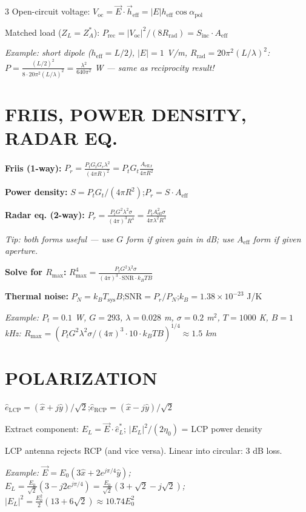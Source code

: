 \documentclass[6pt,landscape]{article}
\begin{document}
\begin{multicols}{3}
Open-circuit voltage: $V_\text{oc}=\vec{E}\cdot\vec{h}_\text{eff}=|E|h_\text{eff}\cos\alpha_\text{pol}$

Matched load ($Z_L=Z_A^*$): $P_\text{rec}=|V_\text{oc}|^2/(8R_\text{rad})=S_\text{inc}\cdot A_\text{eff}$

\textit{Example: short dipole ($h_\text{eff}=L/2$), $|E|=1$ V/m, $R_\text{rad}=20\pi^2(L/\lambda)^2$:
$P=\frac{(L/2)^2}{8\cdot20\pi^2(L/\lambda)^2}=\frac{\lambda^2}{640\pi^2}$ W — same as reciprocity result!}

\section*{FRIIS, POWER DENSITY, RADAR EQ.}
\textbf{Friis (1-way):} $P_r=\frac{P_t G_t G_r\lambda^2}{(4\pi R)^2}=P_t G_t\frac{A_\text{eff,r}}{4\pi R^2}$

\textbf{Power density:} $S=P_t G_t/(4\pi R^2)$;\quad $P_r=S\cdot A_\text{eff}$

\textbf{Radar eq. (2-way):} $P_r=\frac{P_t G^2\lambda^2\sigma}{(4\pi)^3 R^4}=\frac{P_t A_\text{eff}^2\sigma}{4\pi\lambda^2 R^4}$

\textit{Tip: both forms useful — use $G$ form if given gain in dB; use $A_\text{eff}$ form if given aperture.}

\textbf{Solve for $R_\text{max}$:} $R_\text{max}^4=\frac{P_t G^2\lambda^2\sigma}{(4\pi)^3\cdot\text{SNR}\cdot k_B T B}$

\textbf{Thermal noise:} $P_N=k_B T_\text{sys}B$;\quad SNR$=P_r/P_N$;\quad $k_B=1.38\times10^{-23}$ J/K

\textit{Example: $P_t=0.1$ W, $G=293$, $\lambda=0.028$ m, $\sigma=0.2$ m$^2$, $T=1000$ K, $B=1$ kHz:
$R_\text{max}=(P_t G^2\lambda^2\sigma/(4\pi)^3\cdot10\cdot k_B T B)^{1/4}\approx1.5$ km}

\section*{POLARIZATION}
$\hat{e}_\text{LCP}=(\hat{x}+j\hat{y})/\sqrt{2}$;\quad $\hat{e}_\text{RCP}=(\hat{x}-j\hat{y})/\sqrt{2}$

Extract component: $E_L=\vec{E}\cdot\hat{e}_L^*$; $|E_L|^2/(2\eta_0)$ = LCP power density

LCP antenna rejects RCP (and vice versa). Linear into circular: 3 dB loss.

\textit{Example: $\vec{E}=E_0(3\hat{x}+2e^{j\pi/4}\hat{y})$; $E_L=\frac{E_0}{\sqrt{2}}(3-j2e^{j\pi/4})=\frac{E_0}{\sqrt{2}}(3+\sqrt{2}-j\sqrt{2})$; $|E_L|^2=\frac{E_0^2}{2}(13+6\sqrt{2})\approx10.74E_0^2$}


\end{multicols}
\end{document}
